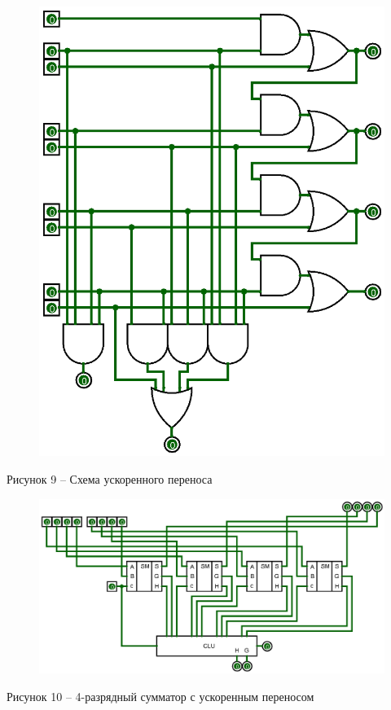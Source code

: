\documentclass[a4paper,14pt]{extarticle}
\begin{document}
  \begin{figure}[h]
    \centering
    \includegraphics[width=0.6\linewidth]{images/s-4-2}
  \end{figure}
  \begin{center}
    Рисунок 9 – Схема ускоренного переноса
  \end{center}
  
  \pagebreak
  \begin{figure}[h]
    \centering
    \includegraphics[width=0.9\linewidth]{images/s-4-3}
  \end{figure}
  \begin{center}
    Рисунок 10 – 4-разрядный сумматор с ускоренным переносом
  \end{center}
  
\end{document}
